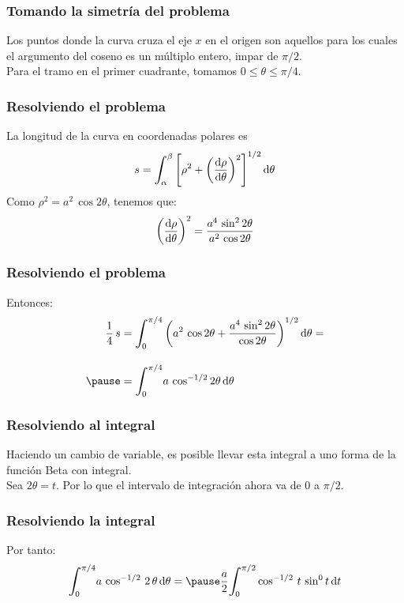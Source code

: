 \documentclass[12pt]{beamer}
\begin{document}
\begin{frame}
\frametitle{Tomando la simetría del problema}
Los puntos donde la curva cruza el eje $x$ en el origen son aquellos para los cuales el argumento del coseno es un múltiplo entero, impar de $\pi / 2$. 
\\
\bigskip
Para el tramo en el primer cuadrante, tomamos $0 \leq \theta \leq \pi/4$.
\end{frame}
\begin{frame}
\frametitle{Resolviendo el problema}
La longitud de la curva en coordenadas polares es
\begin{align*}
s = \scaleint{6ex}_{\bs \alpha}^{\beta} \left[ \rho^{2} + \left( \dv{\rho}{\theta} \right)^{2} \right]^{1/2} \dd{\theta}
\end{align*}
\pause
Como $\rho^{2} = a^{2} \, \cos 2 \theta$, tenemos que:
\begin{align*}
\left( \dv{\rho}{\theta} \right)^{2} = \dfrac{a^{4} \, \sin^{2} 2 \theta}{a^{2} \, \cos 2 \theta}
\end{align*}
\end{frame}
\begin{frame}
\frametitle{Resolviendo el problema}
Entonces:
\begin{eqnarray*}
\begin{aligned}
\dfrac{1}{4} \, s &= \scaleint{6ex}_{\bs {0}}^{\pi/4} \left( a^{2} \, \cos 2 \theta + \dfrac{a^{4} \, \sin^{2} 2 \theta}{\cos 2 \theta} \right)^{1/2} \dd{\theta} = \\[1em] \pause
&= \scaleint{6ex}_{\bs {0}}^{\pi/4} a \, \cos^{-1/2} 2 \theta \dd{\theta}
\end{aligned}
\end{eqnarray*}
\end{frame}
\begin{frame}
\frametitle{Resolviendo al integral}
Haciendo un cambio de variable, es posible llevar esta integral a uno forma de la función Beta con integral.
\\
\bigskip
\pause
Sea $2 \theta = t$. Por lo que el intervalo de integración ahora va de $0$ a $\pi/2$.
\end{frame}
\begin{frame}
\frametitle{Resolviendo la integral}
Por tanto:
\begin{eqnarray*}
\begin{aligned}
\scaleint{6ex}_{\bs 0}^{\pi/4} a \, \cos^{-1/2} \, 2 \, \theta \dd{\theta} = \pause \dfrac{a}{2} \scaleint{6ex}_{\bs {0}}^{\pi/2} \cos^{-1/2} \, t \, \sin^{0} t \dd{t}
\end{aligned}
\end{eqnarray*}
\end{frame}
\end{document}
